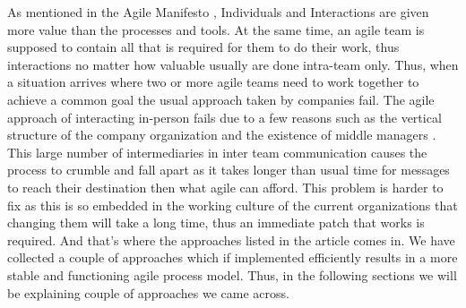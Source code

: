 As mentioned in the Agile Manifesto \cite{beck2001agile}, Individuals and Interactions are given more value than the processes and tools. At the same time, an agile team is supposed to contain all that is required for them to do their work, thus interactions no matter how valuable usually are done intra-team only. Thus, when a situation arrives where two or more agile teams need to work together to achieve a common goal the usual approach taken by companies fail. The agile approach of interacting in-person fails due to a few reasons such as the vertical structure of the company organization and the existence of middle managers \cite{dzone_article}. This large number of intermediaries in inter team communication causes the process to crumble and fall apart as it takes longer than usual time for messages to reach their destination then what agile can afford.
This problem is harder to fix as this is so embedded in the working culture of the current organizations that changing them will take a long time, thus an immediate patch that works is required. And that’s where the approaches listed in the article comes in. We have collected a couple of approaches which if implemented efficiently results in a more stable and functioning agile process model. Thus, in the following sections we will be explaining couple of approaches we came across.
